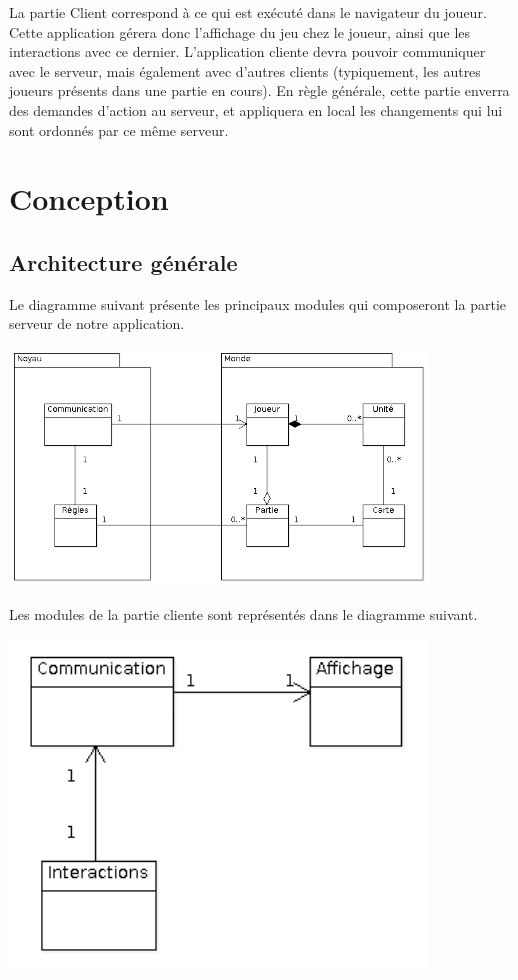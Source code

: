 \documentclass[a4paper,10pt]{report}
\begin{document}
      La partie Client correspond à ce qui est exécuté dans le navigateur du joueur. Cette application gérera donc l'affichage du jeu chez le joueur, ainsi que les interactions avec ce dernier. L'application cliente devra pouvoir communiquer avec le serveur, mais également avec d'autres clients (typiquement, les autres joueurs présents dans une partie en cours). En règle générale, cette partie enverra des demandes d'action au serveur, et appliquera en local les changements qui lui sont ordonnés par ce même serveur. 


  \chapter{Conception}

    \section{Architecture générale}

      Le diagramme suivant présente les principaux modules qui composeront la partie serveur de notre application. 
      
      \includegraphics[width=420px]{diagrammes/moteur_serveur_classes.png}
      
      Les modules de la partie cliente sont représentés dans le diagramme suivant. 
      
      \includegraphics[width=420px]{diagrammes/moteur_client_classes.png}
\end{document}
